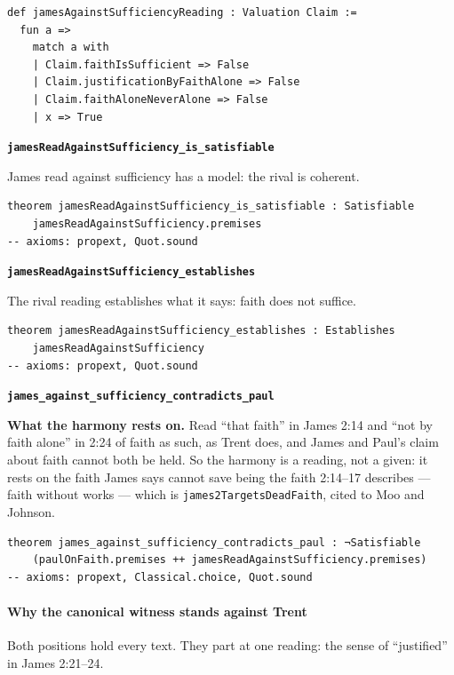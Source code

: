 \documentclass[11pt,paper=\testimonypaper,DIV=13,parskip=false]{scrartcl}
\begin{document}
{\small\begin{verbatim}
def jamesAgainstSufficiencyReading : Valuation Claim :=
  fun a =>
    match a with
    | Claim.faithIsSufficient => False
    | Claim.justificationByFaithAlone => False
    | Claim.faithAloneNeverAlone => False
    | x => True
\end{verbatim}}
\par\medskip\noindent\textbf{\texttt{james\allowbreak{}Read\allowbreak{}Against\allowbreak{}Sufficiency\_\allowbreak{}is\_\allowbreak{}satisfiable}}\par\nobreak\noindent
James read against sufficiency has a model: the rival is coherent.

{\small\begin{verbatim}
theorem jamesReadAgainstSufficiency_is_satisfiable : Satisfiable
    jamesReadAgainstSufficiency.premises
-- axioms: propext, Quot.sound
\end{verbatim}}
\par\medskip\noindent\textbf{\texttt{james\allowbreak{}Read\allowbreak{}Against\allowbreak{}Sufficiency\_\allowbreak{}establishes}}\par\nobreak\noindent
The rival reading establishes what it says: faith does not suffice.

{\small\begin{verbatim}
theorem jamesReadAgainstSufficiency_establishes : Establishes
    jamesReadAgainstSufficiency
-- axioms: propext, Quot.sound
\end{verbatim}}
\par\medskip\noindent\textbf{\texttt{james\_\allowbreak{}against\_\allowbreak{}sufficiency\_\allowbreak{}contradicts\_\allowbreak{}paul}}\par\nobreak\noindent
\textbf{What the harmony rests on.} Read “that faith” in James 2:14 and “not by faith alone” in 2:24 of faith as such, as Trent does, and James and Paul’s claim about faith cannot both be held. So the harmony is a reading, not a given: it rests on the faith James says cannot save being the faith 2:14–17 describes — faith without works — which is \texttt{james2\allowbreak{}Targets\allowbreak{}Dead\allowbreak{}Faith}, cited to Moo and Johnson.

{\small\begin{verbatim}
theorem james_against_sufficiency_contradicts_paul : ¬Satisfiable
    (paulOnFaith.premises ++ jamesReadAgainstSufficiency.premises)
-- axioms: propext, Classical.choice, Quot.sound
\end{verbatim}}
\paragraph*{Why the canonical witness stands against Trent}
\leavevmode\par\nobreak
Both positions hold every text. They part at one reading: the sense of “justified” in James 2:21–24.
\end{document}
